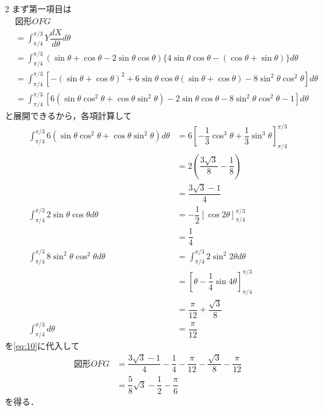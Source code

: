 \documentclass[../../main.tex]{subfiles}
\begin{document}
\begin{multicols}{2}
  まず第一項目は
  \begin{align}
    & \text{図形}OFG                                                                                                                                                               \\
    & = \int_{\pi/4}^{\pi/3} Y \dfrac{dX}{d\theta} d\theta                                                                                                                        \\
    & = \int_{\pi/4}^{\pi/3} \left(\sin\theta+\cos\theta-2\sin\theta\cos\theta\right)\{4\sin\theta\cos\theta-(\cos\theta+\sin\theta)\} d\theta                                   \\
    & = \int_{\pi/4}^{\pi/3} \left[-(\sin\theta+\cos\theta)^2 + 6\sin\theta\cos\theta(\sin\theta+\cos\theta) - 8\sin^2\theta\cos^2\theta\right] d\theta                          \\
    & = \int_{\pi/4}^{\pi/3} \left[ 6(\sin\theta\cos^2\theta+\cos\theta\sin^2\theta) - 2\sin\theta\cos\theta -8\sin^2\theta\cos^2\theta - 1 \right] d\theta \label{eq:10}
  \end{align}
  と展開できるから，各項計算して
  \begin{align}
    \int_{\pi/4}^{\pi/3} 6(\sin\theta\cos^2\theta+\cos\theta\sin^2\theta) d\theta
    & = 6 \left[-\dfrac{1}{3}\cos^3\theta+\dfrac{1}{3}\sin^3\theta\right]_{\pi/4}^{\pi/3} \\
    & = 2\left(\dfrac{3\sqrt{3}}{8}-\dfrac{1}{8}\right)                                   \\
    & = \dfrac{3\sqrt{3}-1}{4}                                                           \\
    \int_{\pi/4}^{\pi/3} 2\sin\theta\cos\theta d\theta
    & = -\dfrac{1}{2}[\cos 2\theta]_{\pi/4}^{\pi/3}                                      \\
    & = \dfrac{1}{4}                                                                     \\
    \int_{\pi/4}^{\pi/3} 8\sin^2\theta\cos^2\theta d\theta
    & = \int_{\pi/4}^{\pi/3} 2\sin^2 2\theta d\theta                                    \\
    & = \left[\theta - \dfrac{1}{4}\sin 4\theta \right]_{\pi/4}^{\pi/3}                  \\
    & = \dfrac{\pi}{12} + \dfrac{\sqrt{3}}{8}                                             \\
    \int_{\pi/4}^{\pi/3} d\theta
    & = \dfrac{\pi}{12}
  \end{align}
  を\cref{eq:10}に代入して
  \begin{align}
    \text{図形}OFG
    & = \dfrac{3\sqrt{3}-1}{4} - \dfrac{1}{4} - \dfrac{\pi}{12} - \dfrac{\sqrt{3}}{8} - \dfrac{\pi}{12} \\
    & = \dfrac{5}{8}\sqrt{3} - \dfrac{1}{2} - \dfrac{\pi}{6} \label{eq:11}
  \end{align}
  を得る．


\end{multicols}
\end{document}
